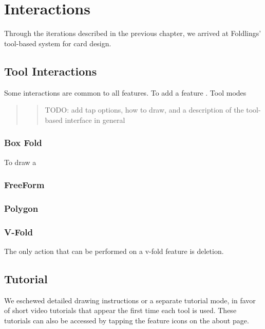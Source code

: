 \section{Interactions}\label{interactions}

Through the iterations described in the previous chapter, we arrived at
Foldlings' tool-based system for card design.

\subsection{Tool Interactions}\label{tool-interactions}

Some interactions are common to all features. To add a feature . Tool
modes

\begin{quote}
\begin{quote}
TODO: add tap options, how to draw, and a description of the tool-based
interface in general
\end{quote}
\end{quote}

\subsubsection{Box Fold}\label{box-fold}

To draw a

\subsubsection{FreeForm}\label{freeform}

\subsubsection{Polygon}\label{polygon}

\subsubsection{V-Fold}\label{v-fold}

The only action that can be performed on a v-fold feature is deletion.

\subsection{Tutorial}\label{tutorial}

We eschewed detailed drawing instructions or a separate tutorial mode,
in favor of short video tutorials that appear the first time each tool
is used. These tutorials can also be accessed by tapping the feature
icons on the about page.

